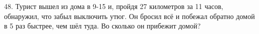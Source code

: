 48. Турист вышел из дома в 9-15 и, пройдя 27 километров за 11 часов, обнаружил, что забыл выключить утюг. Он бросил всё и побежал обратно домой в 5 раз быстрее, чем шёл туда. Во сколько он прибежит домой?\\
